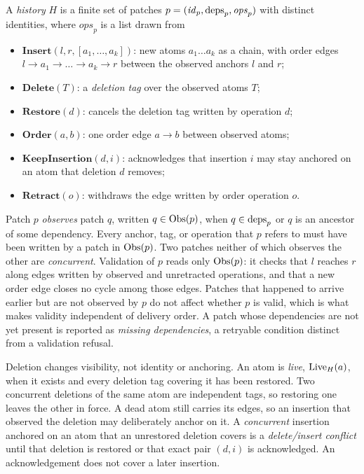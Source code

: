 \begin{definition}\label{def:history}
A \emph{history} $H$ is a finite set of patches $p=(\mathit{id}_p,\operatorname{deps}_p,\mathit{ops}_p)$ with distinct identities, where $\mathit{ops}_p$ is a list drawn from
\begin{itemize}
\item $\mathbf{Insert}(l,r,[a_1,\dots,a_k])$: new atoms $a_1\dots a_k$ as a chain, with order edges $l\to a_1\to\dots\to a_k\to r$ between the observed anchors $l$ and $r$;
\item $\mathbf{Delete}(T)$: a \emph{deletion tag} over the observed atoms $T$;
\item $\mathbf{Restore}(d)$: cancels the deletion tag written by operation $d$;
\item $\mathbf{Order}(a,b)$: one order edge $a\to b$ between observed atoms;
\item $\mathbf{KeepInsertion}(d,i)$: acknowledges that insertion $i$ may stay anchored on an atom that deletion $d$ removes;
\item $\mathbf{Retract}(o)$: withdraws the edge written by order operation $o$.
\end{itemize}
\end{definition}
Patch $p$ \emph{observes} patch $q$, written $q\in\operatorname{Obs}(p)$, when $q\in\operatorname{deps}_p$ or $q$ is an ancestor of some dependency. Every anchor, tag, or operation that $p$ refers to must have been written by a patch in $\operatorname{Obs}(p)$. Two patches neither of which observes the other are \emph{concurrent}. Validation of $p$ reads only $\operatorname{Obs}(p)$: it checks that $l$ reaches $r$ along edges written by observed and unretracted operations, and that a new order edge closes no cycle among those edges. Patches that happened to arrive earlier but are not observed by $p$ do not affect whether $p$ is valid, which is what makes validity independent of delivery order. A patch whose dependencies are not yet present is reported as \emph{missing dependencies}, a retryable condition distinct from a validation refusal.

Deletion changes visibility, not identity or anchoring. An atom is \emph{live}, $\operatorname{Live}_H(a)$, when it exists and every deletion tag covering it has been restored. Two concurrent deletions of the same atom are independent tags, so restoring one leaves the other in force. A dead atom still carries its edges, so an insertion that observed the deletion may deliberately anchor on it. A \emph{concurrent} insertion anchored on an atom that an unrestored deletion covers is a \emph{delete/insert conflict} until that deletion is restored or that exact pair $(d,i)$ is acknowledged. An acknowledgement does not cover a later insertion.

